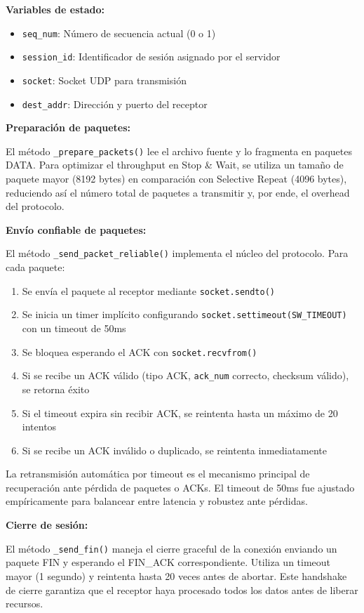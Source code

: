 \textbf{Variables de estado:}
\begin{itemize}
    \item \texttt{seq\_num}: Número de secuencia actual (0 o 1)
    \item \texttt{session\_id}: Identificador de sesión asignado por el servidor
    \item \texttt{socket}: Socket UDP para transmisión
    \item \texttt{dest\_addr}: Dirección y puerto del receptor
\end{itemize}

\textbf{Preparación de paquetes:}

El método \texttt{\_prepare\_packets()} lee el archivo fuente y lo fragmenta en paquetes DATA. Para optimizar el throughput en Stop \& Wait, se utiliza un tamaño de paquete mayor (8192 bytes) en comparación con Selective Repeat (4096 bytes), reduciendo así el número total de paquetes a transmitir y, por ende, el overhead del protocolo.

\textbf{Envío confiable de paquetes:}

El método \texttt{\_send\_packet\_reliable()} implementa el núcleo del protocolo. Para cada paquete:

\begin{enumerate}
    \item Se envía el paquete al receptor mediante \texttt{socket.sendto()}
    \item Se inicia un timer implícito configurando \texttt{socket.settimeout(SW\_TIMEOUT)} con un timeout de 50ms
    \item Se bloquea esperando el ACK con \texttt{socket.recvfrom()}
    \item Si se recibe un ACK válido (tipo ACK, \texttt{ack\_num} correcto, checksum válido), se retorna éxito
    \item Si el timeout expira sin recibir ACK, se reintenta hasta un máximo de 20 intentos
    \item Si se recibe un ACK inválido o duplicado, se reintenta inmediatamente
\end{enumerate}

La retransmisión automática por timeout es el mecanismo principal de recuperación ante pérdida de paquetes o ACKs. El timeout de 50ms fue ajustado empíricamente para balancear entre latencia y robustez ante pérdidas.

\textbf{Cierre de sesión:}

El método \texttt{\_send\_fin()} maneja el cierre graceful de la conexión enviando un paquete FIN y esperando el FIN\_ACK correspondiente. Utiliza un timeout mayor (1 segundo) y reintenta hasta 20 veces antes de abortar. Este handshake de cierre garantiza que el receptor haya procesado todos los datos antes de liberar recursos.

